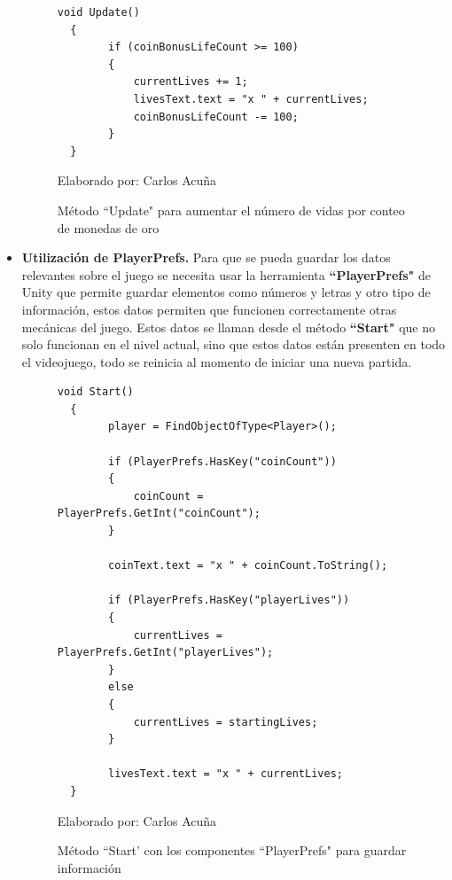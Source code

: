 \documentclass[a4paper, openright, 12pt]{report}
\begin{document}
\begin{itemize}
\begin{figure}[h]
\captionsetup{justification=centering,margin=2cm}
\centering
\lstset{language=C, breaklines=true, basicstyle=\footnotesize}
\lstset{numbers=left, numberstyle=\tiny, stepnumber=1, numbersep=-2pt}
\captionsetup{justification=centering,margin=2cm}
\begin{lstlisting}[frame=single]
  void Update()
  {
        if (coinBonusLifeCount >= 100)
        {
            currentLives += 1;
            livesText.text = "x " + currentLives;
            coinBonusLifeCount -= 100;
        }
  }
\end{lstlisting}
\caption{Método ``Update" para aumentar el número de vidas por conteo de monedas de oro}
Elaborado por: Carlos Acuña
\end{figure}
\clearpage
\item \textbf{Utilización de PlayerPrefs.} Para que se pueda guardar los datos relevantes sobre el juego se necesita usar la herramienta \textbf{``PlayerPrefs"} de Unity que permite guardar elementos como números y letras y otro tipo de información, estos datos permiten que funcionen correctamente otras mecánicas del juego. Estos datos se llaman desde el método \textbf{``Start"} que no solo funcionan en el nivel actual, sino que estos datos están presenten en todo el videojuego, todo se reinicia al momento de iniciar una nueva partida.

\begin{figure}[h]
\captionsetup{justification=centering,margin=2cm}
\centering
\lstset{language=C, breaklines=true, basicstyle=\footnotesize}
\lstset{numbers=left, numberstyle=\tiny, stepnumber=1, numbersep=-2pt}
\captionsetup{justification=centering,margin=2cm}
\begin{lstlisting}[frame=single]
  void Start()
  {
        player = FindObjectOfType<Player>();

        if (PlayerPrefs.HasKey("coinCount"))
        {
            coinCount = PlayerPrefs.GetInt("coinCount");
        }

        coinText.text = "x " + coinCount.ToString();

        if (PlayerPrefs.HasKey("playerLives"))
        {
            currentLives = PlayerPrefs.GetInt("playerLives");
        }
        else
        {
            currentLives = startingLives;
        }

        livesText.text = "x " + currentLives;
  }
\end{lstlisting}
\caption{Método ``Start' con los componentes ``PlayerPrefs" para guardar información}
Elaborado por: Carlos Acuña
\end{figure}


\end{itemize}
\end{document}
